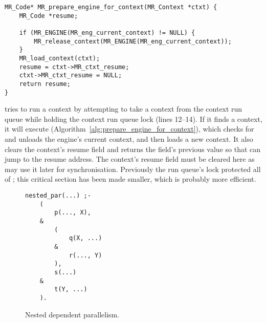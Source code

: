 \begin{algorithm}
\begin{verbatim}
MR_Code* MR_prepare_engine_for_context(MR_Context *ctxt) {
    MR_Code *resume;

    if (MR_ENGINE(MR_eng_current_context) != NULL) {
        MR_release_context(MR_ENGINE(MR_eng_current_context));
    }
    MR_load_context(ctxt);
    resume = ctxt->MR_ctxt_resume;
    ctxt->MR_ctxt_resume = NULL;
    return resume;
}
\end{verbatim}
\caption{\prepareengineforcontext}
\label{alg:prepare_engine_for_context}
\end{algorithm}

\idle tries to run a context by attempting to take a context from the
context run queue while holding the context run queue lock (lines 12--14).
If it finds a context,
it will execute \prepareengineforcontext
(Algorithm~\ref{alg:prepare_engine_for_context}),
which checks for and unloads the engine's current context,
and then loads a new context.
It also clears the context's resume field and returns the field's previous
value so that \idle can jump to the resume address.
The context's resume field must be cleared here as
\joinandcontinue may use it later for synchronisation.
Previously the run queue's lock protected all of \idle;
this critical section has been made smaller,
which is probably more efficient.

\begin{figure}
\begin{center}
\begin{verbatim}
nested_par(...) ;-
    (
        p(..., X),
    &
        (
            q(X, ...)
        &
            r(..., Y)
        ),
        s(...)
    &
        t(Y, ...)
    ).
\end{verbatim}
\end{center}
\caption{Nested dependent parallelism.}
\label{fig:nested_dep_par}
\end{figure}

